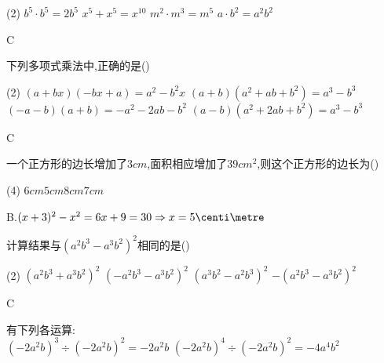 \documentclass[cn,blue,12pt]{elegantbook}
\begin{document}
\begin{shiti}
\begin{shiti}[resume]
            \begin{tasks}(2)
                \task \(b^5 \cdot b^5 = 2b^5\)
                \task \(x^5 + x^5 = x^{10}\)
                \task \(m^2 \cdot m^3 = m^5\)
                \task \(a \cdot b^2 = a^2b^2\)
            \end{tasks}
\begin{solution}
                C\\
\end{solution}
        \item 下列多项式乘法中,正确的是(\qquad)\\
            \begin{tasks}(2)
                \task \((a+bx)(-bx+a)=a^2-b^2x\)
                \task \((a+b)(a^2+ab+b^2)=a^3-b^3\)
                \task \((-a-b)(a+b)=-a^2-2ab-b^2\)
                \task \((a-b)(a^2+2ab+b^2)=a^3-b^3\)
            \end{tasks}
\begin{solution}
                C\\
\end{solution}
        \item 一个正方形的边长增加了\( 3 cm\),面积相应增加了\(39cm^2\),则这个正方形的边长为(\qquad)\\
            \begin{tasks}(4)
                \task \( 6cm  \)\task \( 5 cm  \)\task \( 8 cm  \)\task \( 7 cm\)
            \end{tasks}
\begin{solution}
                B.\((x+3)^2-x^2=6x+9=30 \Rightarrow x=5 \centi\metre \)\\
\end{solution}
        \item 计算结果与\((a^2b^3-a^3b^2)^2\)相同的是(\qquad)\\
            \begin{tasks}(2)
                \task \(( a^2b^3+a^3b^2 )^2\)
                \task \((-a^2b^3-a^3b^2)^2\)
                \task \((a^3b^2-a^2b^3)^2\)
                \task \(-(a^2b^3-a^3b^2)^2\)
            \end{tasks}
\begin{solution}
                C\\
\end{solution}
        \item 有下列各运算:\\
             \((-2a^2b)^3 \div ( -2a^2b )^2 = -2a^2b\) \qquad {}\((-2a^2b)^4 \div (-2a^2b)^2 = -4a^4b^2\) \qquad \\

\end{shiti}
\end{shiti}
\end{document}
